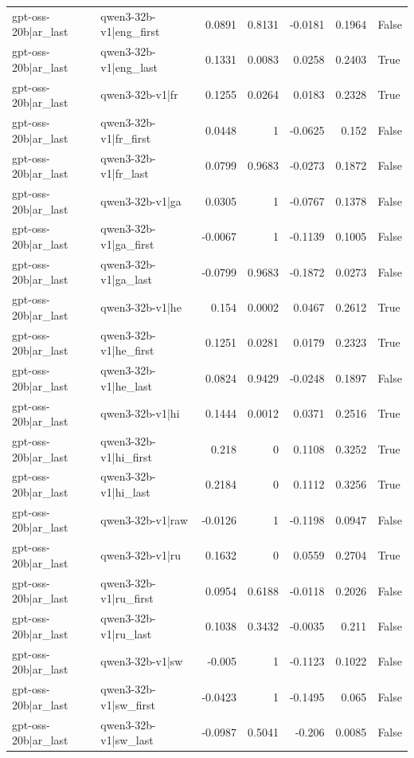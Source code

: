 \begin{table}
\begin{tabular}{l l r r r r l}
gpt-oss-20b|ar_last & qwen3-32b-v1|eng_first & 0.0891 & 0.8131 & -0.0181 & 0.1964 & False \\
gpt-oss-20b|ar_last & qwen3-32b-v1|eng_last & 0.1331 & 0.0083 & 0.0258 & 0.2403 & True \\
gpt-oss-20b|ar_last & qwen3-32b-v1|fr & 0.1255 & 0.0264 & 0.0183 & 0.2328 & True \\
gpt-oss-20b|ar_last & qwen3-32b-v1|fr_first & 0.0448 & 1 & -0.0625 & 0.152 & False \\
gpt-oss-20b|ar_last & qwen3-32b-v1|fr_last & 0.0799 & 0.9683 & -0.0273 & 0.1872 & False \\
gpt-oss-20b|ar_last & qwen3-32b-v1|ga & 0.0305 & 1 & -0.0767 & 0.1378 & False \\
gpt-oss-20b|ar_last & qwen3-32b-v1|ga_first & -0.0067 & 1 & -0.1139 & 0.1005 & False \\
gpt-oss-20b|ar_last & qwen3-32b-v1|ga_last & -0.0799 & 0.9683 & -0.1872 & 0.0273 & False \\
gpt-oss-20b|ar_last & qwen3-32b-v1|he & 0.154 & 0.0002 & 0.0467 & 0.2612 & True \\
gpt-oss-20b|ar_last & qwen3-32b-v1|he_first & 0.1251 & 0.0281 & 0.0179 & 0.2323 & True \\
gpt-oss-20b|ar_last & qwen3-32b-v1|he_last & 0.0824 & 0.9429 & -0.0248 & 0.1897 & False \\
gpt-oss-20b|ar_last & qwen3-32b-v1|hi & 0.1444 & 0.0012 & 0.0371 & 0.2516 & True \\
gpt-oss-20b|ar_last & qwen3-32b-v1|hi_first & 0.218 & 0 & 0.1108 & 0.3252 & True \\
gpt-oss-20b|ar_last & qwen3-32b-v1|hi_last & 0.2184 & 0 & 0.1112 & 0.3256 & True \\
gpt-oss-20b|ar_last & qwen3-32b-v1|raw & -0.0126 & 1 & -0.1198 & 0.0947 & False \\
gpt-oss-20b|ar_last & qwen3-32b-v1|ru & 0.1632 & 0 & 0.0559 & 0.2704 & True \\
gpt-oss-20b|ar_last & qwen3-32b-v1|ru_first & 0.0954 & 0.6188 & -0.0118 & 0.2026 & False \\
gpt-oss-20b|ar_last & qwen3-32b-v1|ru_last & 0.1038 & 0.3432 & -0.0035 & 0.211 & False \\
gpt-oss-20b|ar_last & qwen3-32b-v1|sw & -0.005 & 1 & -0.1123 & 0.1022 & False \\
gpt-oss-20b|ar_last & qwen3-32b-v1|sw_first & -0.0423 & 1 & -0.1495 & 0.065 & False \\
gpt-oss-20b|ar_last & qwen3-32b-v1|sw_last & -0.0987 & 0.5041 & -0.206 & 0.0085 & False \\

\end{tabular}
\end{table}
